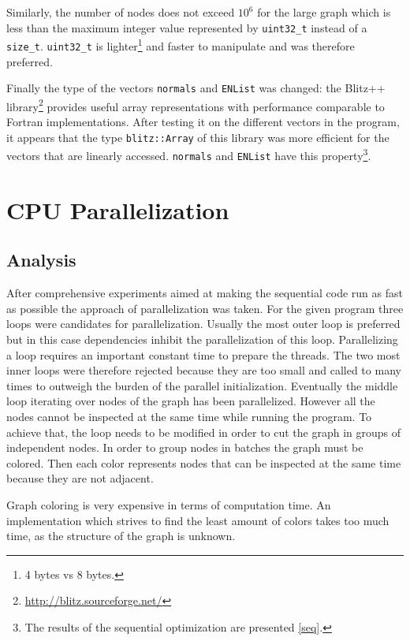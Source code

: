 \documentclass[fleqn,11pt]{SelfArx} %
\theoremstyle{definition}
\begin{document}
Similarly, the number of nodes does not exceed $10^6$ for the large graph which is less than the maximum integer value represented by \verb+uint32_t+ instead of a \verb+size_t+. \verb+uint32_t+ is lighter\footnote{4 bytes vs 8 bytes.} and faster to manipulate and was therefore preferred.

Finally the type of the vectors \verb+normals+ and \verb+ENList+ was changed: the {Blitz++ library}\footnote{\url{http://blitz.sourceforge.net/}} provides useful array representations with performance comparable to Fortran implementations. After testing it on the different vectors in the program, it appears that the type \verb+blitz::Array+ of this library was more efficient for the vectors that are linearly accessed. \verb+normals+ and \verb+ENList+ have this property\footnote{The results of the sequential optimization are presented \ref{seq}.}.


\section{CPU Parallelization}

\subsection{Analysis}

After comprehensive experiments aimed at making the sequential code run as fast as possible the approach of parallelization was taken. For the given program three loops were candidates for parallelization. Usually the most outer loop is preferred but in this case dependencies inhibit the parallelization of this loop. Parallelizing a loop requires an important constant time to prepare the threads. The two most inner loops were therefore rejected because they are too small and called to many times to outweigh the burden of the parallel initialization. Eventually the middle loop iterating over nodes of the graph has been parallelized. However all the nodes cannot be inspected at the same time while running the program. To achieve that, the loop needs to be modified in order to cut the graph in groups of independent nodes. In order to group nodes in batches the graph must be colored. Then each color represents nodes that can be inspected at the same time because they are not adjacent.

Graph coloring is very expensive in terms of computation time. An implementation which strives to find the least amount of colors takes too much time, as the structure of the graph is unknown.
\end{document}
